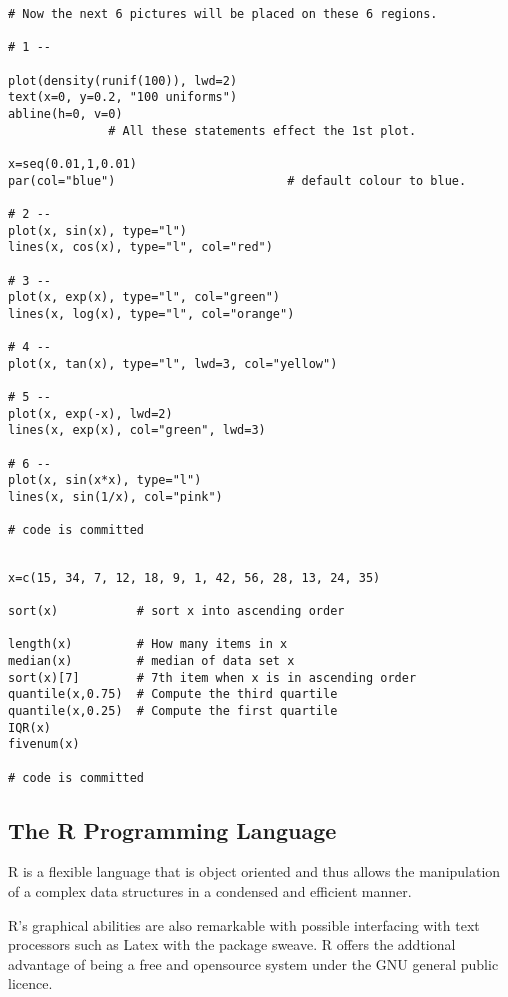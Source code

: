 \begin{verbatim}
# Now the next 6 pictures will be placed on these 6 regions. 

# 1 --

plot(density(runif(100)), lwd=2)
text(x=0, y=0.2, "100 uniforms")        
abline(h=0, v=0)
	          # All these statements effect the 1st plot.

x=seq(0.01,1,0.01)
par(col="blue")                        # default colour to blue.

# 2 --
plot(x, sin(x), type="l")
lines(x, cos(x), type="l", col="red")

# 3 --
plot(x, exp(x), type="l", col="green")
lines(x, log(x), type="l", col="orange")

# 4 --
plot(x, tan(x), type="l", lwd=3, col="yellow")

# 5 --
plot(x, exp(-x), lwd=2)
lines(x, exp(x), col="green", lwd=3)

# 6 --
plot(x, sin(x*x), type="l")
lines(x, sin(1/x), col="pink")

# code is committed
 
\end{verbatim}
\begin{verbatim}
x=c(15, 34, 7, 12, 18, 9, 1, 42, 56, 28, 13, 24, 35)
 
sort(x)           # sort x into ascending order

length(x)         # How many items in x
median(x)         # median of data set x
sort(x)[7]        # 7th item when x is in ascending order
quantile(x,0.75)  # Compute the third quartile
quantile(x,0.25)  # Compute the first quartile
IQR(x)            
fivenum(x)

# code is committed

\end{verbatim}
\newpage

\subsection{The R Programming Language}
R is a flexible language that is object oriented and thus allows the manipulation of a complex
data structures in a condensed and efficient manner.
 
R's graphical abilities are also remarkable with possible interfacing with text processors such as
Latex with the package sweave.
R offers the addtional advantage of being a free and opensource system under the GNU general
public licence.

